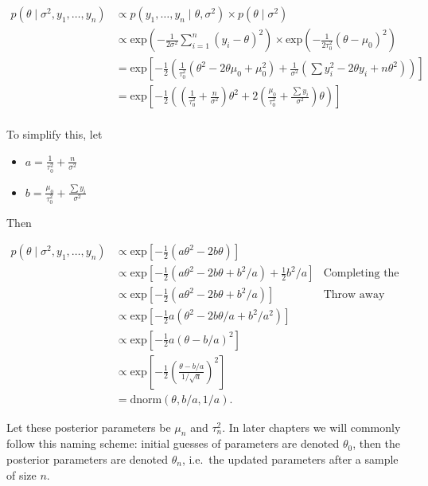 \documentclass[]{article}
\providecommand{\tightlist}{%
  \setlength{\itemsep}{0pt}\setlength{\parskip}{0pt}}
\begin{document}
\begin{align}
p(\theta \mid \sigma^2, y_1, \dots, y_n) &\propto p(y_1, \dots, y_n \mid \theta, \sigma^2) \times p(\theta \mid \sigma^2) \\
&\propto \text{exp}\left( -\frac{1}{2\sigma^2} \sum_{i=1}^n (y_i - \theta)^2 \right) \times \text{exp}\left(-\frac{1}{2 \tau_0^2} (\theta - \mu_0)^2\right) \\
&= \text{exp}\left[ -\frac{1}{2} \left( \frac{1}{\tau_0^2}(\theta^2 - 2\theta\mu_0 + \mu_0^2) + \frac{1}{\sigma^2}(\sum y_i^2 - 2\theta y_i + n\theta^2) \right) \right] \\
&= \text{exp}\left[ -\frac{1}{2} \left( \left(\frac{1}{\tau_0^2} + \frac{n}{\sigma^2}\right)\theta^2 + 2\left( \frac{\mu_0}{\tau_0^2} + \frac{\sum y_i}{\sigma^2} \right)\theta \right) \right] \\
\end{align}

To simplify this, let

\begin{itemize}
\tightlist
\item
  \(a = \frac{1}{\tau_0^2} + \frac{n}{\sigma^2}\)
\item
  \(b = \frac{\mu_0}{\tau_0^2} + \frac{\sum y_i}{\sigma^2}\)
\end{itemize}

Then

\begin{align}
p(\theta \mid \sigma^2, y_1, \dots, y_n) &\propto \text{exp}\left[ -\frac{1}{2} (a\theta^2 - 2b\theta) \right] \\
&\propto \text{exp}\left[ -\frac{1}{2}(a\theta^2 - 2b\theta + b^2/a) + \frac{1}{2} b^2 / a \right] & \text{Completing the square} \\
&\propto \text{exp}\left[ -\frac{1}{2}(a\theta^2 - 2b\theta + b^2/a) \right] &\text{Throw away constants} \\
&\propto \text{exp}\left[ -\frac{1}{2}a(\theta^2 - 2b\theta / a + b^2/a^2) \right] \\
&\propto \text{exp}\left[ -\frac{1}{2}a(\theta - b/a)^2 \right] \\
&\propto \text{exp}\left[ -\frac{1}{2}\left( \frac{\theta - b/a}{1 / \sqrt{a}} \right)^2 \right] \\
&= \text{dnorm}(\theta, b/a, 1/a).
\end{align}

Let these posterior parameters be \(\mu_n\) and \(\tau_n^2\). In later
chapters we will commonly follow this naming scheme: initial guesses of
parameters are denoted \(\theta_0\), then the posterior parameters are
denoted \(\theta_n\), i.e.~the updated parameters after a sample of size
\(n\).
\end{document}
